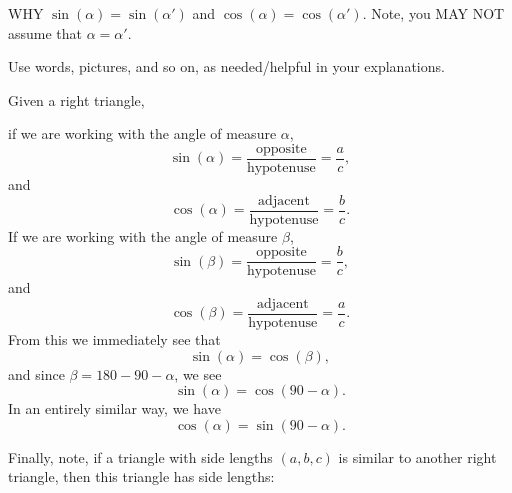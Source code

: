 \documentclass[handout,noauthor,nooutcomes,12pt,hints]{ximera}
\begin{document}
\begin{question}
\begin{enumerate}
\begin{center}
    \end{center}
      WHY $\sin(\alpha) = \sin(\alpha')$ and $\cos(\alpha) =
      \cos(\alpha')$. Note, you MAY NOT assume that $\alpha =
      \alpha'$.
  \end{enumerate}
  Use words, pictures, and so on, as needed/helpful in your
  explanations.
  \begin{freeResponse}
    Given a right triangle,
    \begin{center}
    \end{center}
    if we are working with the angle of measure $\alpha$,
    \[
    \sin(\alpha) = \frac{\text{opposite}}{\text{hypotenuse}} = \frac{a}{c},
    \]
    and
    \[
    \cos(\alpha) = \frac{\text{adjacent}}{\text{hypotenuse}} = \frac{b}{c}.
    \]
    If we are working with the angle of measure $\beta$,
    \[
    \sin(\beta) = \frac{\text{opposite}}{\text{hypotenuse}} = \frac{b}{c},
    \]
    and
    \[
    \cos(\beta) = \frac{\text{adjacent}}{\text{hypotenuse}} = \frac{a}{c}.
    \]
    From this we immediately see that
    \[
    \sin(\alpha) = \cos(\beta),
    \]
    and since $\beta = 180-90-\alpha$, we see
    \[
    \sin(\alpha) = \cos(90-\alpha).
    \]
    In an entirely similar way, we have
    \[
    \cos(\alpha) = \sin(90-\alpha).
    \]

    Finally, note, if a triangle with side lengths $(a,b,c)$ is
    similar to another right triangle, then this triangle has side
    lengths:
          \begin{center}
\end{center}
\end{freeResponse}
\end{question}
\end{document}
